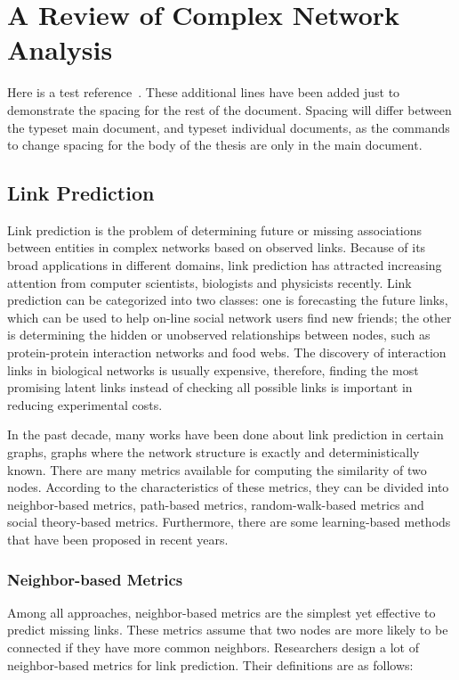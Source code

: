 \documentclass[\main/thesis.tex]{subfiles}
\begin{document}
\chapter{A Review of Complex Network Analysis}

Here is a test reference~\cite{Knuth68:art_of_programming}.
These additional lines have been added just to demonstrate the spacing
for the rest of the document. Spacing will differ between the typeset main
document, and typeset individual documents, as the commands
to change spacing for the body of the thesis are only in the main document.

\section{Link Prediction}\label{previous:link-prediction}
Link prediction is the problem of determining future or missing associations between entities in complex networks based on observed links. Because of its broad applications in different domains, link prediction has attracted increasing attention from computer scientists, biologists and physicists recently. Link prediction can be categorized into two classes: one is forecasting the future links, which can be used to help on-line social network users find new friends; the other is determining the hidden or unobserved relationships between nodes, such as protein-protein interaction networks and food webs. The discovery of interaction links in biological networks is usually expensive, therefore, finding the most promising latent links instead of checking all possible links is important in reducing experimental costs.

In the past decade, many works have been done about link prediction in certain graphs, graphs where the network structure is exactly and deterministically known. There are many metrics available for computing the similarity of two nodes. According to the characteristics of these metrics, they can be divided into neighbor-based metrics, path-based metrics, random-walk-based metrics and social theory-based metrics. Furthermore, there are some learning-based methods that have been proposed in recent years.
\subsection{Neighbor-based Metrics}

Among all approaches, neighbor-based metrics are the simplest yet effective to predict missing links. These metrics assume that two nodes are more likely to be connected if they have more common neighbors. Researchers design a lot of neighbor-based metrics for link prediction. Their definitions are as follows:
\end{document}
